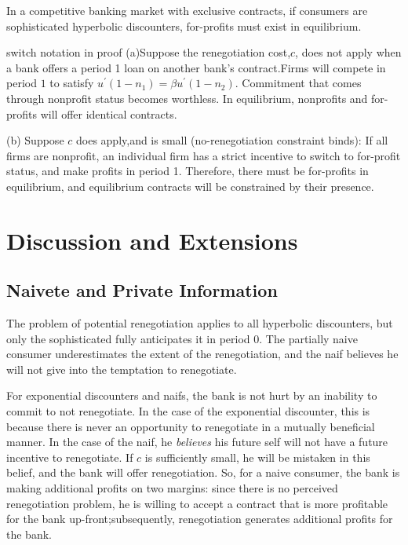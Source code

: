 \documentclass[11pt]{article}%
\newtheorem{proposition}{Proposition}
\newenvironment{proof}[1][Proof]{\noindent\textbf{#1.} }{\ \rule{0.5em}{0.5em}}
\providecommand{\DIFdel}[1]{{\protect\color{red} \scriptsize #1}} %
\begin{document}
{%
\DIFdel{In a competitive banking market with exclusive contracts, if consumers are
sophisticated hyperbolic discounters, for-profits must exist in equilibrium.
}%

\DIFdel{switch notation in proof}%
\DIFdel{(a)Suppose the renegotiation cost,$c$,
does not apply when a bank offers a period 1 loan on another bank's
contract.Firms will compete in period $1$ to satisfy $u^{\prime }\left(
1-n_{1}\right) =\beta u^{\prime }\left( 1-n_{2}\right) $. Commitment that
comes through nonprofit status becomes worthless. In equilibrium, nonprofits
and for-profits will offer identical contracts.
}%

\DIFdel{(b) Suppose $c$ does apply,and is small (no-renegotiation constraint
binds): If all firms are nonprofit, an individual firm has a strict
incentive to switch to for-profit status, and make profits in period 1.
Therefore, there must be for-profits in equilibrium, and equilibrium
contracts will be constrained by their presence. }%

\section{\DIFdel{Discussion and Extensions}}
\addtocounter{section}{-1}%

\subsection{\DIFdel{Naivete and Private Information}}
\addtocounter{subsection}{-1}%

\DIFdel{The problem of potential renegotiation applies to all hyperbolic
discounters, but only the sophisticated fully anticipates it in period 0.
The partially naive consumer underestimates the extent of the renegotiation,
and the naif believes he will not give into the temptation to renegotiate.
}%

\DIFdel{For exponential discounters and naifs, the bank is not hurt by an inability
to commit to not renegotiate. In the case of the exponential discounter,
this is because there is never an opportunity to renegotiate in a mutually
beneficial manner. In the case of the naif, he \textit{believes} his future
self will not have a future incentive to renegotiate. If $c$ is sufficiently
small, he will be mistaken in this belief, and the bank will offer
renegotiation. So, for a naive consumer, the bank is making additional
profits on two margins: since there is no perceived renegotiation problem,
he is willing to accept a contract that is more profitable for the bank
up-front;subsequently, renegotiation generates additional profits for the
bank.
}%

}
\end{document}
